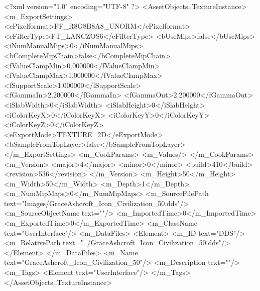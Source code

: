 <?xml version="1.0" encoding="UTF-8" ?>
<AssetObjects..TextureInstance>
	<m_ExportSettings>
		<ePixelformat>PF_R8G8B8A8_UNORM</ePixelformat>
		<eFilterType>FT_LANCZOS6</eFilterType>
		<bUseMips>false</bUseMips>
		<iNumManualMips>0</iNumManualMips>
		<bCompleteMipChain>false</bCompleteMipChain>
		<fValueClampMin>0.000000</fValueClampMin>
		<fValueClampMax>1.000000</fValueClampMax>
		<fSupportScale>1.000000</fSupportScale>
		<fGammaIn>2.200000</fGammaIn>
		<fGammaOut>2.200000</fGammaOut>
		<iSlabWidth>0</iSlabWidth>
		<iSlabHeight>0</iSlabHeight>
		<iColorKeyX>0</iColorKeyX>
		<iColorKeyY>0</iColorKeyY>
		<iColorKeyZ>0</iColorKeyZ>
		<eExportMode>TEXTURE_2D</eExportMode>
		<bSampleFromTopLayer>false</bSampleFromTopLayer>
	</m_ExportSettings>
	<m_CookParams>
		<m_Values/>
	</m_CookParams>
	<m_Version>
		<major>4</major>
		<minor>0</minor>
		<build>410</build>
		<revision>536</revision>
	</m_Version>
	<m_Height>50</m_Height>
	<m_Width>50</m_Width>
	<m_Depth>1</m_Depth>
	<m_NumMipMaps>0</m_NumMipMaps>
	<m_SourceFilePath text="Images/GraceAshcroft_Icon_Civilization_50.dds"/>
	<m_SourceObjectName text=""/>
	<m_ImportedTime>0</m_ImportedTime>
	<m_ExportedTime>0</m_ExportedTime>
	<m_ClassName text="UserInterface"/>
	<m_DataFiles>
		<Element>
			<m_ID text="DDS"/>
			<m_RelativePath text="../GraceAshcroft_Icon_Civilization_50.dds"/>
		</Element>
	</m_DataFiles>
	<m_Name text="GraceAshcroft_Icon_Civilization_50"/>
	<m_Description text=""/>
	<m_Tags>
		<Element text="UserInterface"/>
	</m_Tags>
</AssetObjects..TextureInstance>
